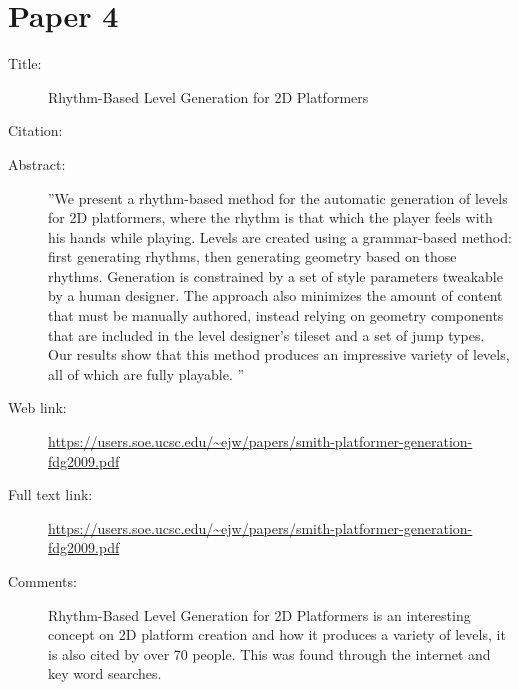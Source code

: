 \documentclass{scrartcl}
\begin{document}
	\section*{Paper 4}
	\begin{description}
		\item[Title:] Rhythm-Based Level Generation for 2D Platformers
		\item[Citation:] \cite{Rhytem}
		\item[Abstract:] ''We present a rhythm-based method for the automatic generation
		of levels for 2D platformers, where the rhythm is that which the
		player feels with his hands while playing. Levels are created using
		a grammar-based method: first generating rhythms, then
		generating geometry based on those rhythms. Generation is
		constrained by a set of style parameters tweakable by a human
		designer. The approach also minimizes the amount of content that
		must be manually authored, instead relying on geometry
		components that are included in the level designer’s tileset and a
		set of jump types. Our results show that this method produces an
		impressive variety of levels, all of which are fully playable. ''
		
		\item[Web link:] \url{https://users.soe.ucsc.edu/~ejw/papers/smith-platformer-generation-fdg2009.pdf}
		\item[Full text link:] \url{https://users.soe.ucsc.edu/~ejw/papers/smith-platformer-generation-fdg2009.pdf}
		\item[Comments:] Rhythm-Based Level Generation for 2D Platformers is an interesting concept on 2D platform creation and how it produces a variety of levels, it is also cited by over 70 people. This was found through the internet and key word searches.
	\end{description}
	
\end{document}
